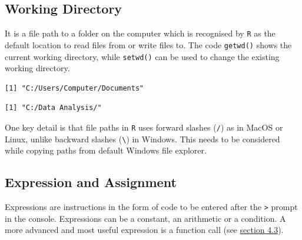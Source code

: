 \hypertarget{wdir}{%
\subsection{Working Directory}\label{wdir}}

It is a file path to a folder on the computer which is recognised by
\texttt{R} as the default location to read files from or write files to.
The code \texttt{getwd()} shows the current working directory, while
\texttt{setwd()} can be used to change the existing working directory.

\begin{Shaded}
\begin{Highlighting}[]
\NormalTok{()}
\end{Highlighting}
\end{Shaded}

\begin{verbatim}
[1] "C:/Users/Computer/Documents"
\end{verbatim}

\begin{Shaded}
\begin{Highlighting}[]
\NormalTok{(}\NormalTok{)}
\NormalTok{()}
\end{Highlighting}
\end{Shaded}

\begin{verbatim}
[1] "C:/Data Analysis/"
\end{verbatim}

One key detail is that file paths in \texttt{R} uses forward slashes
(\texttt{/}) as in MacOS or Linux, unlike backward slashes
(\texttt{\textbackslash{}}) in Windows. This needs to be considered
while copying paths from default Windows file explorer.

\hypertarget{expression-and-assignment}{%
\subsection{Expression and Assignment}\label{expression-and-assignment}}

Expressions are instructions in the form of code to be entered after the
\texttt{\textgreater{}} prompt in the console. Expressions can be a
constant, an arithmetic or a condition. A more advanced and most useful
expression is a function call (see \protect\hyperlink{ObjFun}{section
4.3}).

